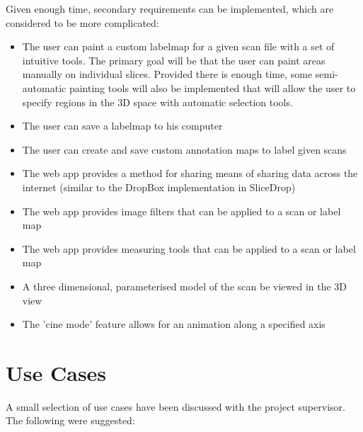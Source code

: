\documentclass[a4paper,11pt,titlepage]{article}
\begin{document}
Given enough time, secondary requirements can be implemented, which are considered to be more complicated:

\begin{itemize}
\item The user can paint a custom labelmap for a given scan file with a set of intuitive tools. The primary goal will be that the user can paint areas manually on individual slices. Provided there is enough time, some semi-automatic painting tools will also be implemented that will allow the user to specify regions in the 3D space with automatic selection tools. 
\item The user can save a labelmap to his computer
\item The user can create and save custom annotation maps to label given scans
\item The web app provides a method for sharing  means of sharing data across the internet (similar to the DropBox implementation in SliceDrop)
\item The web app provides image filters that can be applied to a scan or label map
\item The web app provides measuring tools that can be applied to a scan or label map
\item A three dimensional, parameterised model of the scan be viewed in the 3D view
\item The 'cine mode' feature allows for an animation along a specified axis
\end{itemize}

\section{Use Cases}

A small selection of use cases have been discussed with the project supervisor. The following were suggested:
\end{document}
